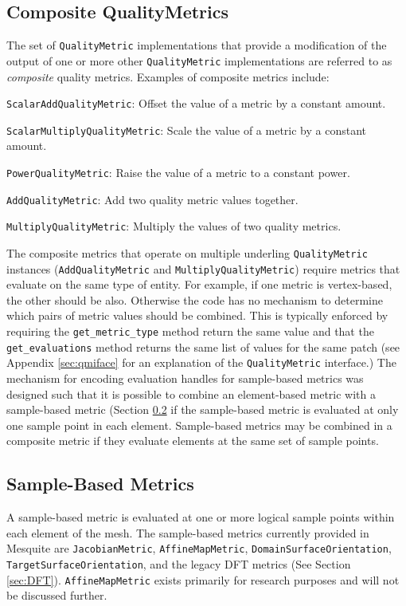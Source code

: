\documentclass{article}
\begin{document}
\subsection{Composite QualityMetrics}

The set of \texttt{QualityMetric} implementations that provide a modification of the output of one or more other \texttt{QualityMetric} implementations are referred to as \emph{composite} quality metrics.  Examples of composite metrics include:
\begin{description}
\item{\texttt{ScalarAddQualityMetric}}: Offset the value of a metric by a constant amount.
\item{\texttt{ScalarMultiplyQualityMetric}}: Scale the value of a metric by a constant amount.
\item{\texttt{PowerQualityMetric}}: Raise the value of a metric to a constant power.
\item{\texttt{AddQualityMetric}}: Add two quality metric values together.
\item{\texttt{MultiplyQualityMetric}}: Multiply the values of two quality metrics.
\end{description}

The composite metrics that operate on multiple underling \texttt{QualityMetric} instances (\texttt{AddQualityMetric} and \texttt{MultiplyQualityMetric}) require metrics that evaluate on the same type of entity.  For example, if one metric is vertex-based, the other should be also.  Otherwise the code has no mechanism to determine which pairs of metric values should be combined.  This is typically enforced by requiring the \texttt{get\_metric\_type} method return the same value and that the \texttt{get\_evaluations} method returns the same list of values for the same patch (see Appendix \ref{sec:qmiface} for an explanation of the \texttt{QualityMetric} interface.)   The mechanism for encoding evaluation handles for sample-based metrics was designed such that it is possible to combine an element-based metric with a sample-based metric (Section \ref{sec:sample-metrics} if the sample-based metric is evaluated at only one sample point in each element.  Sample-based metrics may be combined in a composite metric if they evaluate elements at the same set of sample points.

\subsection{Sample-Based Metrics}
\label{sec:sample-metrics}
A sample-based metric is evaluated at one or more logical sample points within each element of the mesh. The sample-based metrics currently provided in Mesquite are \texttt{JacobianMetric}, \texttt{AffineMapMetric}, \texttt{DomainSurfaceOrientation}, \texttt{TargetSurfaceOrientation}, and the legacy DFT metrics (See Section \ref{sec:DFT}). \texttt{AffineMapMetric} exists primarily for research purposes and will not be discussed further.
\end{document}
